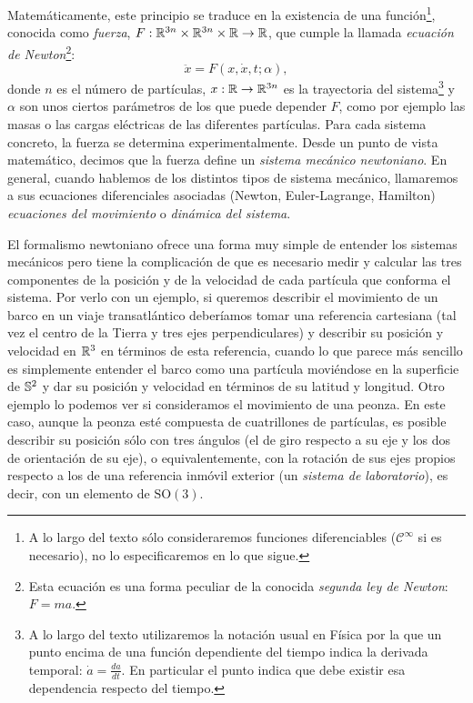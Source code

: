 Matemáticamente, este principio se traduce en la existencia de una función\footnote{A lo largo del texto sólo consideraremos funciones diferenciables ($\mathscr{C}^{\infty}$ si es necesario), no lo especificaremos en lo que sigue.}, conocida como \emph{fuerza}, $F: \mathbb{R}^{3n} \times \mathbb{R}^{3n} \times \mathbb{R} \rightarrow \mathbb{R}$, que cumple la llamada \emph{ecuación de Newton}\footnote{Esta ecuación es una forma peculiar de la conocida \emph{segunda ley de Newton}: $F=ma$.}:
\begin{equation*}
  \ddot{x} = F(x,\dot{x},t;\alpha),
\end{equation*}
donde $n$ es el número de partículas, $x:\mathbb{R} \rightarrow \mathbb{R}^{3n}$ es la trayectoria del sistema\footnote{A lo largo del texto utilizaremos la notación usual en Física por la que un punto encima de una función dependiente del tiempo indica la derivada temporal: $\dot{a}=\frac{da}{dt}$. En particular el punto indica que debe existir esa dependencia respecto del tiempo.} y $\alpha$ son unos ciertos parámetros de los que puede depender $F$, como por ejemplo las masas o las cargas eléctricas de las diferentes partículas. Para cada sistema concreto, la fuerza se determina experimentalmente. Desde un punto de vista matemático, decimos que la fuerza define un \emph{sistema mecánico newtoniano}. En general, cuando hablemos de los distintos tipos de sistema mecánico, llamaremos a sus ecuaciones diferenciales asociadas (Newton, Euler-Lagrange, Hamilton) \emph{ecuaciones del movimiento} o \emph{dinámica del sistema}.

El formalismo newtoniano ofrece una forma muy simple de entender los sistemas mecánicos pero tiene la complicación de que es necesario medir y calcular las tres componentes de la posición y de la velocidad de cada partícula que conforma el sistema. Por verlo con un ejemplo, si queremos describir el movimiento de un barco en un viaje transatlántico deberíamos tomar una referencia cartesiana (tal vez el centro de la Tierra y tres ejes perpendiculares) y describir su posición y velocidad en $\mathbb{R}^3$ en términos de esta referencia, cuando lo que parece más sencillo es simplemente entender el barco como una partícula moviéndose en la superficie de $\mathbb{S}^2$ y dar su posición y velocidad en términos de su latitud y longitud.
Otro ejemplo lo podemos ver si consideramos el movimiento de una peonza. En este caso, aunque la peonza esté compuesta de cuatrillones de partículas, es posible describir su posición sólo con tres ángulos (el de giro respecto a su eje y los dos de orientación de su eje), o equivalentemente, con la rotación de sus ejes propios respecto a los de una referencia inmóvil exterior (un \emph{sistema de laboratorio}), es decir, con un elemento de $\mathrm{SO}(3)$. 

